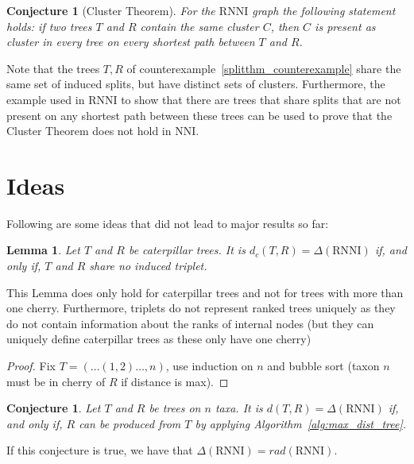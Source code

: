 \documentclass{amsart}
\newcommand{\nni}{\mathrm{NNI}}
\newcommand{\rnni}{\mathrm{RNNI}}
\newtheorem{conjecture}[definition]{Conjecture}
\newtheorem{lemma}[definition]{Lemma}
\begin{document}
\begin{conjecture}[Cluster Theorem]
	For the $\rnni$ graph the following statement holds:
	if two trees $T$ and $R$ contain the same cluster $C$, then $C$ is present as cluster in every tree on every shortest path between $T$ and $R$.
	\label{cluster_theorem}
\end{conjecture}

Note that the trees $T, R$ of counterexample~\ref{splitthm_counterexample} share the same set of induced splits, but have distinct sets of clusters.
Furthermore, the example used in $\rnni$ to show that there are trees that share splits that are not present on any shortest path between these trees can be used to prove that the Cluster Theorem does not hold in $\nni$.


\section{Ideas}

Following are some ideas that did not lead to major results so far:

\begin{lemma}
    Let $T$ and $R$ be caterpillar trees.
    It is $d_c(T,R) = \Delta(\rnni)$ if, and only if, $T$ and $R$ share no induced triplet.
\end{lemma}

This Lemma does only hold for caterpillar trees and not for trees with more than one cherry.
Furthermore, triplets do not represent ranked trees uniquely as they do not contain information about the ranks of internal nodes (but they can uniquely define caterpillar trees as these only have one cherry)

\begin{proof}
    Fix $T = (\ldots(1,2) \ldots ,n)$, use induction on $n$ and bubble sort (taxon $n$ must be in cherry of $R$ if distance is max).
\end{proof}

\begin{conjecture}
    Let $T$ and $R$ be trees on $n$ taxa.
    It is $d(T,R) = \Delta(\rnni)$ if, and only if, $R$ can be produced from $T$ by applying Algorithm~\ref{alg:max_dist_tree}.
\end{conjecture}

If this conjecture is true, we have that $\Delta(\rnni) = rad(\rnni)$.
\end{document}
